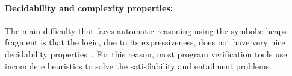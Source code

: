 \documentclass[twoside,11pt]{article}
\newcommand{\sep}{.\,}
\newcommand{\preds}{\mathbb{P}}
\newcommand{\loc}{\mathit{Loc}}
\newcommand{\model}[1]{\left[\!\left[#1\right]\!\right]}
\begin{document}
%



\paragraph{Decidability and complexity properties:}
The main difficulty that faces automatic reasoning using the symbolic heaps fragment is that the logic, 
due to its expressiveness, does not have very nice decidability properties~\cite{AntonopoulosGHKO14}.
For this reason, most program verification tools use incomplete heuristics to solve the satisfiability and entailment problems.
\end{document}
